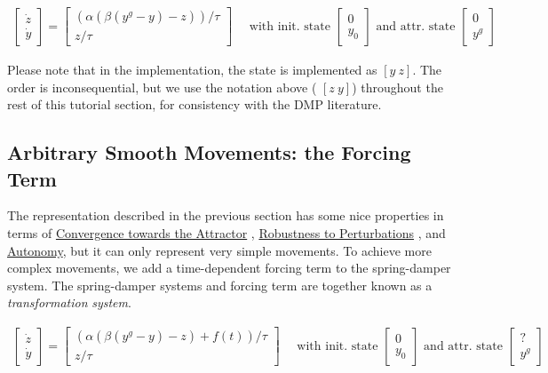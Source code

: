 \begin{eqnarray*} \left[ \begin{array}{l} {\dot{z}} \\ {\dot{y}} \end{array} \right] = \left[ \begin{array}{l} (\alpha (\beta({y}^{g}-{y})-{z}))/\tau \\ {z}/\tau \end{array} \right] \mbox{~~~~with init. state~} \left[ \begin{array}{l} 0 \\ y_0 \end{array} \right] \mbox{~and attr. state~} \left[ \begin{array}{l} {0} \\ {y}^g \end{array} \right] \end{eqnarray*}

Please note that in the implementation, the state is implemented as $ [y~z]$. The order is inconsequential, but we use the notation above ( $[z~y]$) throughout the rest of this tutorial section, for consistency with the D\+M\+P literature.\hypertarget{page_dmp_sec_forcing}{}\subsection{Arbitrary Smooth Movements\+: the Forcing Term}\label{page_dmp_sec_forcing}
The representation described in the previous section has some nice properties in terms of \hyperlink{page_dyn_sys_sec_dyn_sys_convergence}{Convergence towards the Attractor} , \hyperlink{page_dyn_sys_sec_dyn_sys_perturbations}{Robustness to Perturbations} , and \hyperlink{page_dyn_sys_sec_dyn_sys_autonomy}{Autonomy}, but it can only represent very simple movements. To achieve more complex movements, we add a time-\/dependent forcing term to the spring-\/damper system. The spring-\/damper systems and forcing term are together known as a {\itshape transformation} {\itshape system}.

\begin{eqnarray*} \left[ \begin{array}{l} {\dot{z}} \\ {\dot{y}} \end{array} \right] = \left[ \begin{array}{l} (\alpha (\beta({y}^{g}-{y})-{z}) + f(t))/\tau \\ {z}/\tau \end{array} \right] \mbox{~~~~with init. state~} \left[ \begin{array}{l} 0 \\ y_0 \end{array} \right] \mbox{~and attr. state~} \left[ \begin{array}{l} {?} \\ {y}^g \end{array} \right] \end{eqnarray*}

